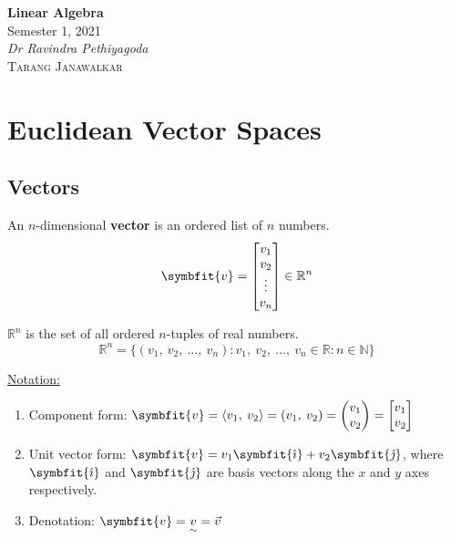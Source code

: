 \documentclass{article}
\date{}
\newcommand{\unitName}{Linear Algebra}
\newcommand{\unitTime}{Semester 1, 2021}
\newcommand{\unitCoordinator}{Dr Ravindra Pethiyagoda}
\newcommand{\documentAuthors}{\textsc{Tarang Janawalkar}}
\begin{document}
%
\begin{titlepage}
    \vspace*{\fill}
    \begin{center}
        \LARGE{\textbf{\unitName}} \\[0.1in]
        \normalsize{\unitTime} \\[0.2in]
        \normalsize\textit{\unitCoordinator} \\[0.2in]
        \documentAuthors
    \end{center}
    \vspace*{\fill}
    \doclicenseThis
    \thispagestyle{empty}
\end{titlepage}
\newpage
%
\tableofcontents
\newpage
%
\section{Euclidean Vector Spaces}
\subsection{Vectors}
\begin{definition}
    An \(n\)-dimensional \textbf{vector} is an ordered list of \(n\)
    numbers.
    \begin{equation*}
        \symbfit{v} =
        \begin{bmatrix}
            v_1    \\
            v_2    \\
            \vdots \\
            v_n
        \end{bmatrix}
        \in \mathbb{R}^n
    \end{equation*}
\end{definition}
\begin{theorem}
    \(\mathbb{R}^n\) is the set of all ordered \(n\)-tuples of real
    numbers.
    \begin{equation*}
        \mathbb{R}^n = \bigl\{\left(v_1,\: v_2,\: \ldots,\: v_n\right): v_1,\: v_2,\: \ldots,\: v_n \in \mathbb{R}: n \in \mathbb{N}\bigr\}
    \end{equation*}
\end{theorem}
\underline{Notation:}
\begin{enumerate}
    \item Component form: \(\symbfit{v} = \left\langle{v_1,\: v_2}\right\rangle = \left(v_1,\: v_2\right) =
          \begin{pmatrix}
              v_1 \\
              v_2
          \end{pmatrix}
          =
          \begin{bmatrix}
              v_1 \\
              v_2
          \end{bmatrix}
          \)
    \item Unit vector form: \(\symbfit{v} = v_1\symbfit{\hat{\imath}} + v_2\symbfit{\hat{\jmath}}\), where \(\symbfit{\hat{\imath}}\) and \(\symbfit{\hat{\jmath}}\) are basis vectors along the \(x\) and \(y\) axes respectively.
    \item Denotation: \(\symbfit{v} = \underset{\sim}{v} = \vec{v}\)
\end{enumerate}
\end{document}
